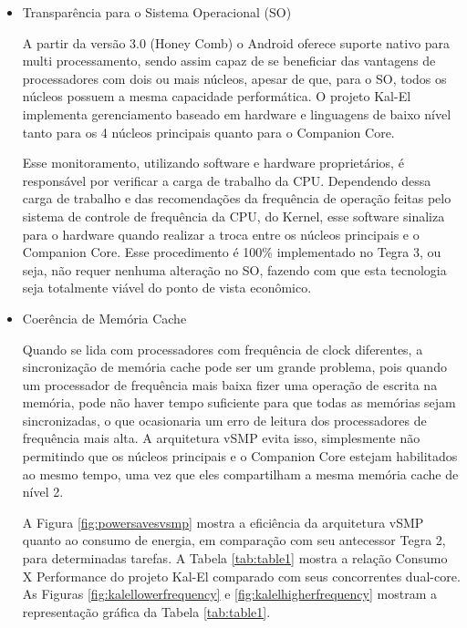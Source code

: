\documentclass[article]{IEEEtran}
\begin{document}
\begin{itemize}
 \item Transpar\^encia para o Sistema Operacional (SO)

A partir da vers\~ao 3.0 (Honey Comb) o Android oferece suporte nativo para multi processamento, sendo assim capaz de se beneficiar das vantagens de processadores com dois ou mais n\'ucleos, apesar de que, para o SO, todos os n\'ucleos possuem a mesma capacidade perform\'atica. O projeto Kal-El implementa gerenciamento baseado em hardware e linguagens de baixo n\'ivel tanto para os 4 n\'ucleos principais quanto para o Companion Core.

Esse monitoramento, utilizando software e hardware propriet\'arios, \'e respons\'avel por verificar a carga de trabalho da CPU. Dependendo dessa carga de trabalho e das recomenda\c{c}\~oes da frequ\^encia de opera\c{c}\~ao feitas pelo sistema de controle de frequ\^encia da CPU, do Kernel, esse software sinaliza para o hardware quando realizar a troca entre os n\'ucleos principais e o Companion Core. Esse procedimento \'e 100\% implementado no Tegra 3, ou seja, n\~ao requer nenhuma altera\c{c}\~ao no SO, fazendo com que esta tecnologia seja totalmente vi\'avel do ponto de vista econ\^omico.

\item Coer\^encia de Mem\'oria Cache

Quando se lida com processadores com frequ\^encia de clock diferentes, a sincroniza\c{c}\~ao de mem\'oria cache pode ser um grande problema, pois quando um processador de frequ\^encia mais baixa fizer uma opera\c{c}\~ao de escrita na mem\'oria, pode n\~ao haver tempo suficiente para que todas as mem\'orias sejam sincronizadas, o que ocasionaria um erro de leitura dos processadores de frequ\^encia mais alta. A arquitetura vSMP evita isso, simplesmente n\~ao permitindo que os n\'ucleos principais e o Companion Core estejam habilitados ao mesmo tempo, uma vez que eles compartilham a mesma mem\'oria cache de n\'ivel 2.

A Figura \ref{fig:powersavesvsmp} mostra a efici\^encia da arquitetura vSMP quanto ao consumo de energia, em compara\c{c}\~ao com seu antecessor Tegra 2, para determinadas tarefas. A Tabela \ref{tab:table1} mostra a rela\c{c}\~ao Consumo X Performance do projeto Kal-El comparado com seus concorrentes dual-core. As Figuras \ref{fig:kalellowerfrequency} e \ref{fig:kalelhigherfrequency} mostram a representa\c{c}\~ao gr\'afica da Tabela \ref{tab:table1}.

\end{itemize}
\end{document}
